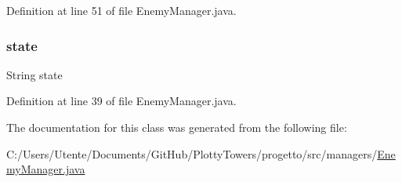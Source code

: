 Definition at line 51 of file Enemy\+Manager.\+java.

\mbox{\label{classmanagers_1_1_enemy_manager_a91ac952876f776b3fbbc8519e093fdbf}} 
\subsubsection{\texorpdfstring{state}{state}}
{\footnotesize\ttfamily String state\hspace{0.3cm}{\ttfamily [private]}}



Definition at line 39 of file Enemy\+Manager.\+java.



The documentation for this class was generated from the following file\+:\begin{DoxyCompactItemize}
\item 
C\+:/\+Users/\+Utente/\+Documents/\+Git\+Hub/\+Plotty\+Towers/progetto/src/managers/\hyperlink{_enemy_manager_8java}{Enemy\+Manager.\+java}\end{DoxyCompactItemize}
